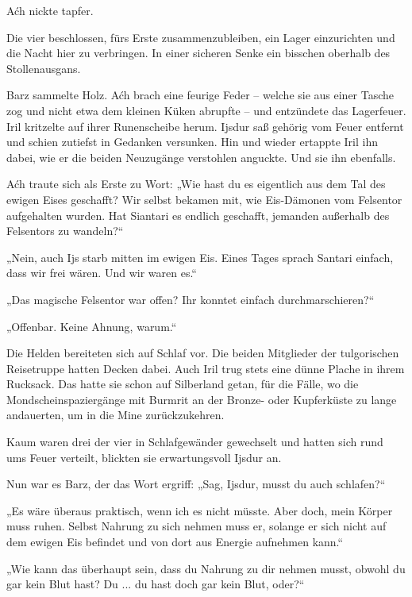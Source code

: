 Aćh nickte tapfer.



\trennzeichen



Die vier beschlossen, fürs Erste zusammenzubleiben, ein Lager einzurichten und die Nacht hier zu verbringen. In einer sicheren Senke ein bisschen oberhalb des Stollenausgans.

Barz sammelte Holz. Aćh brach eine feurige Feder – welche sie aus einer Tasche zog und nicht etwa dem kleinen Küken abrupfte – und entzündete das Lagerfeuer. Iril kritzelte auf ihrer Runenscheibe herum. Ijsdur saß gehörig vom Feuer entfernt und schien zutiefst in Gedanken versunken. Hin und wieder ertappte Iril ihn dabei, wie er die beiden Neuzugänge verstohlen anguckte. Und sie ihn ebenfalls.

Aćh traute sich als Erste zu Wort: „Wie hast du es eigentlich aus dem Tal des ewigen Eises geschafft? Wir selbst bekamen mit, wie Eis-Dämonen vom Felsentor aufgehalten wurden. Hat Siantari es endlich geschafft, jemanden außerhalb des Felsentors zu wandeln?“

„Nein, auch Ijs starb mitten im ewigen Eis. Eines Tages sprach Santari einfach, dass wir frei wären. Und wir waren es.“

„Das magische Felsentor war offen? Ihr konntet einfach durchmarschieren?“

„Offenbar. Keine Ahnung, warum.“

Die Helden bereiteten sich auf Schlaf vor. Die beiden Mitglieder der tulgorischen Reisetruppe hatten Decken dabei. Auch Iril trug stets eine dünne Plache in ihrem Rucksack. Das hatte sie schon auf Silberland getan, für die Fälle, wo die Mondscheinspaziergänge mit Burmrit an der Bronze- oder Kupferküste zu lange andauerten, um in die Mine zurückzukehren.

Kaum waren drei der vier in Schlafgewänder gewechselt und hatten sich rund ums Feuer verteilt, blickten sie erwartungsvoll Ijsdur an.

Nun war es Barz, der das Wort ergriff: „Sag, Ijsdur, musst du auch schlafen?“

„Es wäre überaus praktisch, wenn ich es nicht müsste. Aber doch, mein Körper muss ruhen. Selbst Nahrung zu sich nehmen muss er, solange er sich nicht auf dem ewigen Eis befindet und von dort aus Energie aufnehmen kann.“

„Wie kann das überhaupt sein, dass du Nahrung zu dir nehmen musst, obwohl du gar kein Blut hast? Du ... du hast doch gar kein Blut, oder?“

